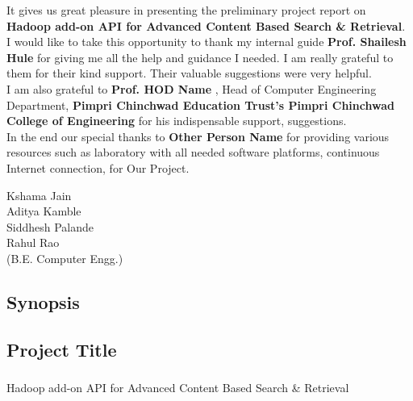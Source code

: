 \documentclass[oneside,a4paper,12pt]{report}
\begin{document}
It gives us great pleasure in presenting the preliminary project report on \textbf{Hadoop add-on API for Advanced Content Based Search \& Retrieval}. \\[4ex]

I would like to take this opportunity to thank my internal guide \textbf{Prof. Shailesh Hule} for giving me all the help and guidance I needed. I am really grateful to them for their kind support. Their valuable suggestions were very helpful. \\[4ex]

I am also grateful to \textbf{Prof. HOD Name} , Head of Computer Engineering Department, \textbf{Pimpri Chinchwad Education Trust's Pimpri Chinchwad College of Engineering} for his indispensable support, suggestions. \\[4ex]

In the end our special thanks to \textbf{Other Person Name} for providing various resources such as laboratory with all needed software platforms, continuous Internet connection,
for Our Project. \\[4ex]

\begin{flushright}
Kshama Jain \\
Aditya Kamble \\
Siddhesh Palande \\
Rahul Rao \\
(B.E. Computer Engg.) \\
\end{flushright}



\newpage

\begingroup
\let\cleardoublepage\clearpage
\tableofcontents
\listoffigures
\listoftables
\let\cleardoublepage\clearpage
\endgroup

\begin{center}
\chapter{Synopsis}
\end{center}

\newpage

\section{Project Title}
\paragraph{} 
Hadoop add-on API for Advanced Content Based Search \& Retrieval
\end{document}
